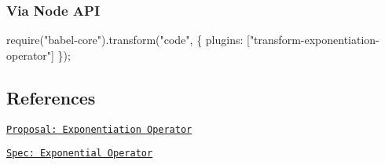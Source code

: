 \subsubsection*{Via Node A\+PI}


\begin{DoxyCode}
require("babel-core").transform("code", \{
  plugins: ["transform-exponentiation-operator"]
\});
\end{DoxyCode}


\subsection*{References}


\begin{DoxyItemize}
\item \href{https://github.com/rwaldron/exponentiation-operator}{\tt Proposal\+: Exponentiation Operator}
\item \href{https://rwaldron.github.io/exponentiation-operator/}{\tt Spec\+: Exponential Operator} 
\end{DoxyItemize}